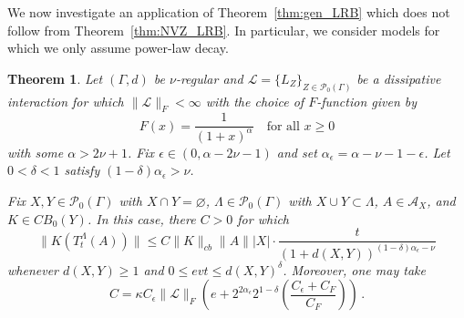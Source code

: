 \documentclass{article}
\newcommand{\<}{\langle}
\renewcommand{\>}{\rangle}
\let\emptyset\varnothing
\numberwithin{equation}{section}
\newtheorem{thm}{Theorem}[section]
\theoremstyle{definition}
\begin{document}
We now investigate an application of Theorem~\ref{thm:gen_LRB} which does not follow from Theorem~\ref{thm:NVZ_LRB}.
In particular, we consider models for which we only assume power-law decay. 

%
%
\begin{thm}\label{thm:poly_dec_lrb}
Let $(\Gamma, d)$ be $\nu$-regular and $\mathscr{L} = \{L_Z \}_{Z \in \mathcal{P}_0(\Gamma)}$ be a dissipative interaction for which
$\| \mathscr{L} \|_F< \infty$ with the choice of $F$-function given by
\begin{equation} \label{power_law_F}
F(x) = \frac{1}{(1+x)^{\alpha}} \quad \mbox{for all } x \geq 0
\end{equation}
with some $\alpha > 2\nu +1$. Fix $\epsilon \in (0, \alpha - 2 \nu -1)$ and set $\alpha_{\epsilon} = \alpha - \nu - 1- \epsilon$.
Let $0 < \delta < 1$ satisfy $(1- \delta)\alpha_{\epsilon} > \nu$. 

Fix $X,Y \in \mathcal{P}_0(\Gamma)$ with $X \cap Y = \emptyset$, $\Lambda \in \mathcal{P}_0( \Gamma)$ with $X \cup Y \subset \Lambda$, 
$A \in \mathcal{A}_X$, and $K\in CB_0(Y)$. In this case, there $C>0$ for which 
\begin{equation} \label{power_law_lrb}
\| K (T^{\Lambda}_t(A)) \| \leq  C \| K \|_{cb} \| A \| |X| \cdot \frac{t}{(1+ d(X,Y))^{(1- \delta) \alpha_{\epsilon} - \nu}}
\end{equation}
whenever $d(X,Y) \geq 1$ and $0 \leq evt \leq d(X,Y)^{\delta}$. Moreover, one may take
\begin{equation} \label{constant} 
C =  \kappa C_{\epsilon} \| \mathscr{L} \|_F  \left( e + 2^{2\alpha_{\epsilon}} 2^{1- \delta} \left( \frac{C_{\epsilon} + C_F}{C_F} \right) \right) \, .
\end{equation}
\end{thm}
\end{document}
